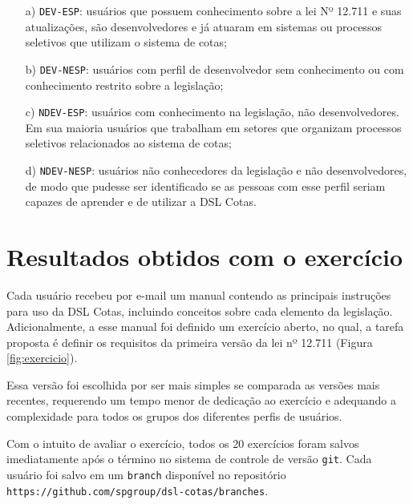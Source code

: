 \begin{enumerate}
    \item[a)] \texttt{DEV-ESP}: usuários que possuem conhecimento sobre a lei Nº 12.711 e suas atualizações, são desenvolvedores e já atuaram em sistemas ou processos seletivos que utilizam o sistema de cotas;
    \item[b)] \texttt{DEV-NESP}: usuários com perfil de desenvolvedor sem conhecimento ou com conhecimento restrito sobre a legislação;
    \item[c)] \texttt{NDEV-ESP}: usuários com conhecimento na legislação, não desenvolvedores. Em sua maioria usuários que trabalham em setores que organizam processos seletivos relacionados ao sistema de cotas;
    \item[d)] \texttt{NDEV-NESP}: usuários não conhecedores da legislação e não desenvolvedores, de modo que pudesse ser identificado se as pessoas com esse perfil seriam capazes de aprender e de utilizar a DSL Cotas.
\end{enumerate}


\begin{landscape}

\end{landscape}

\section{Resultados obtidos com o exercício}
\label{sec:analiseexercicio}

Cada usuário recebeu por e-mail um manual  contendo as principais instruções para uso da DSL Cotas, incluindo conceitos sobre cada elemento da legislação. Adicionalmente, a esse manual foi definido um exercício aberto, no qual, a tarefa proposta é definir os requisitos da primeira versão da lei nº 12.711 (Figura \ref{fig:exercicio}). 



Essa versão foi escolhida por ser mais simples se comparada as versões mais recentes, requerendo um tempo menor de dedicação ao exercício e adequando a complexidade para todos os grupos dos diferentes perfis de usuários. 


Com o intuito de avaliar o exercício, todos os 20 exercícios foram salvos imediatamente após o término no sistema de controle de versão \texttt{git}. Cada usuário foi salvo em um \texttt{branch} disponível no repositório \texttt{https://github.com/spgroup/dsl-cotas/branches}.


